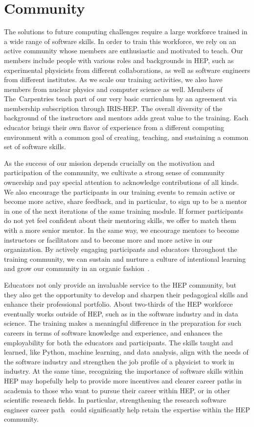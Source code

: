 \documentclass[twocolumn]{svjour3}          %
\begin{document}
\section{Community}\label{sec:Community}
%
The solutions to future computing challenges require a large workforce trained in a wide range of software skills. In order to train this workforce, we rely on an active community whose members are enthusiastic and motivated to teach. Our members include people with various roles and backgrounds in HEP, such as experimental physicists from different collaborations, as well as software engineers from different institutes. As we scale our training activities, we also have members from nuclear physics and computer science as well. Members of The~Carpentries teach part of our very basic curriculum by an agreement via membership subscription through IRIS-HEP. The overall diversity of the background of the instructors and mentors adds great value to the training. Each educator brings their own flavor of experience from a different computing environment with a common goal of creating, teaching, and sustaining a common set of software skills.

As the success of our mission depends crucially on the motivation and participation of the community, we cultivate a strong sense of community ownership and pay special attention to acknowledge contributions of all kinds. We also encourage the participants in our training events to remain active or become more  active, share feedback, and in particular, to sign up to be a mentor in one of the next iterations of the same training module. If former participants do not yet feel confident about their mentoring skills, we offer to match them with a more senior mentor. In the same way, we encourage mentors to become instructors or facilitators and to become more and more active in our organization. By actively engaging participants and educators throughout the training community, we can sustain and nurture a culture of intentional learning and grow our community in an organic fashion~\cite{hsf-community-building}.

Educators not only provide an invaluable service to the HEP community, but they also get the opportunity to develop and sharpen their pedagogical skills and enhance their professional portfolio. About two-thirds of the HEP workforce eventually works outside of HEP, such as in the software industry and in data science. The training makes a meaningful difference in the preparation for such careers in terms of software knowledge and experience, and enhances the employability for both the educators and participants. The skills taught and learned, like Python, machine learning, and data analysis, align with the needs of the software industry and strengthen the job profile of a physicist to work in industry. At the same time, recognizing the importance of software skills within HEP may hopefully help to provide more incentives and clearer career paths in academia to those who want to pursue their career within HEP, or in other scientific research fields.
In particular, strengthening the research software engineer career path~\cite{rse_dan,rse_irishep} could significantly help retain the expertise within the HEP community.
\end{document}
